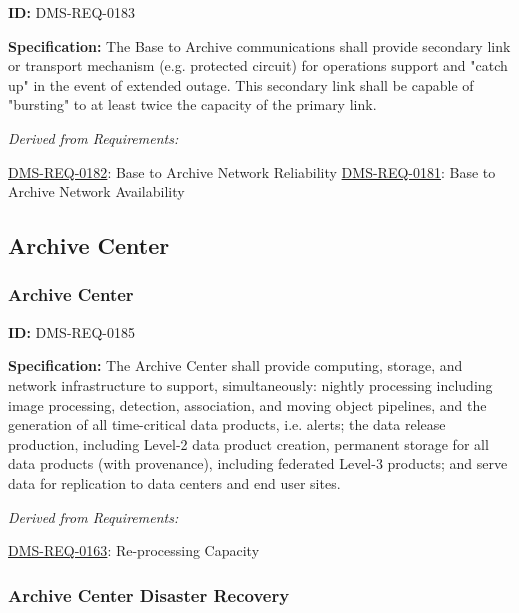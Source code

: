 \documentclass[SE,toc,lsstdraft]{lsstdoc}
\begin{document}
\label{DMS-REQ-0183}
\textbf{ID:} DMS-REQ-0183

\textbf{Specification: }The Base to Archive communications shall provide secondary link or transport mechanism (e.g. protected circuit) for operations support and "catch up"  in the event of extended outage.  This secondary link shall be capable of "bursting" to at least twice the capacity of the primary link.






\emph{Derived from Requirements:}

\hyperref[DMS-REQ-0182]{DMS-REQ-0182}:
Base to Archive Network Reliability \newline
\hyperref[DMS-REQ-0181]{DMS-REQ-0181}:
Base to Archive Network Availability \newline


\subsection{Archive Center}





\subsubsection{Archive Center}

\label{DMS-REQ-0185}
\textbf{ID:} DMS-REQ-0185

\textbf{Specification:} The Archive Center shall provide computing, storage, and network infrastructure to support, simultaneously: nightly processing including image processing, detection, association, and moving object pipelines, and the generation of all time-critical data products, i.e. alerts; the data release production, including Level-2 data product creation, permanent storage for all data products (with provenance), including federated Level-3 products; and serve data for replication to data centers and end user sites.






\emph{Derived from Requirements:}

\hyperref[DMS-REQ-0163]{DMS-REQ-0163}:
Re-processing Capacity \newline


\subsubsection{Archive Center Disaster Recovery}
\end{document}
